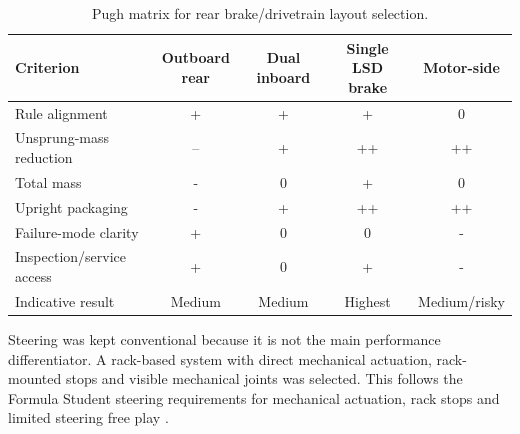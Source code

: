 \begin{table}[H]
\centering
\caption{Pugh matrix for rear brake/drivetrain layout selection.}
\label{tab:pugh_brake_wheel}
\setlength{\tabcolsep}{3pt}
\begin{tabularx}{\linewidth}{|>{\raggedright\arraybackslash}X|c|c|c|c|}
\hline
\textbf{Criterion} & \textbf{Outboard rear} & \textbf{Dual inboard} & \textbf{Single LSD brake} & \textbf{Motor-side} \\
\hline
Rule alignment & + & + & + & 0 \\
\hline
Unsprung-mass reduction & -- & + & ++ & ++ \\
\hline
Total mass & - & 0 & + & 0 \\
\hline
Upright packaging & - & + & ++ & ++ \\
\hline
Failure-mode clarity & + & 0 & 0 & - \\
\hline
Inspection/service access & + & 0 & + & - \\
\hline
Indicative result & Medium & Medium & Highest & Medium/risky \\
\hline
\end{tabularx}
\end{table}

Steering was kept conventional because it is not the main performance differentiator. A rack-based system with direct mechanical actuation, rack-mounted stops and visible mechanical joints was selected. This follows the Formula Student steering requirements for mechanical actuation, rack stops and limited steering free play \parencite{zxFSUK2026Rules,zxFSG2026Rules}.

